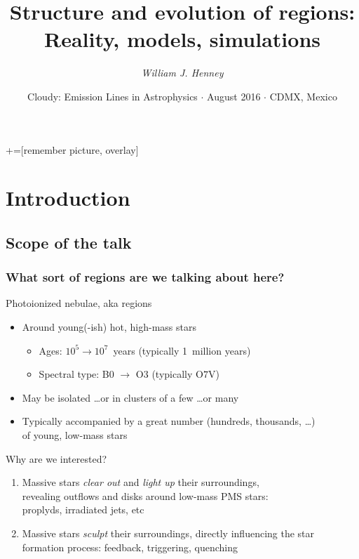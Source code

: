 \documentclass[presentation]{beamer}
\title[\hii{} regions]{Structure and evolution of \hii{} regions:\\
  Reality, models, simulations}
\author{\textit{William J. Henney}}
\date[Cloudy 2016]{
  Cloudy: Emission Lines in Astrophysics
  \(\cdot\) August 2016 \(\cdot\) CDMX, Mexico
}
\institute[IRyA, UNAM, Mexico]
{
  \structure{Instituto de Radioastronomía y Astrofísica\\
    UNAM, Morelia, México}
}
\begin{document}
\maketitle

+=[remember picture, overlay]

\section{Introduction}

\subsection{Scope of the talk}


\begin{frame}
  \frametitle{What sort of regions are we talking about here?}
  \begin{block}{Photoionized nebulae, aka \hii{} regions}
    \begin{itemize}
    \item Around young(-ish) hot, high-mass stars
      \begin{itemize}
      \item Ages: \(10^5 \to 10^7\)~years (typically 1~million years)
      \item Spectral type: B\(0\) \(\to\) O\(3\) (typically O\(7\)V)
      \end{itemize}
    \item May be isolated \dots or in clusters of a few \dots or many
    \item Typically accompanied by a great number (hundreds, thousands,
      \dots)\\ of young, low-mass stars
    \end{itemize}
  \end{block}

  \begin{block}{Why are we interested?}
    \begin{enumerate}
    \item Massive stars \textit{clear out} and \textit{light up} their
      surroundings,\\ revealing outflows and disks around low-mass PMS
      stars:\\ proplyds, irradiated jets, etc
    \item Massive stars \textit{sculpt} their surroundings, directly
      influencing the star formation process: feedback, triggering, quenching
    \end{enumerate}
  \end{block}
  
\end{frame}
\end{document}
